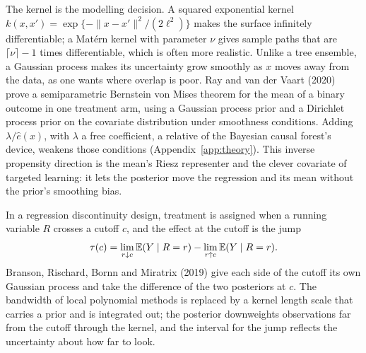 The kernel is the modelling decision. A squared exponential kernel $k(x, x') = \exp\{-\|x - x'\|^2/(2\ell^2)\}$ makes the surface infinitely differentiable; a Mat\'ern kernel with parameter $\nu$ gives sample paths that are $\lceil\nu\rceil - 1$ times differentiable, which is often more realistic. Unlike a tree ensemble, a Gaussian process makes its uncertainty grow smoothly as $x$ moves away from the data, as one wants where overlap is poor. Ray and van der Vaart (2020) prove a semiparametric Bernstein von Mises theorem for the mean of a binary outcome in one treatment arm, using a Gaussian process prior and a Dirichlet process prior on the covariate distribution under smoothness conditions. Adding $\lambda/\hat e(x)$, with $\lambda$ a free coefficient, a relative of the Bayesian causal forest's device, weakens those conditions (Appendix~\ref{app:theory}). This inverse propensity direction is the mean's Riesz representer and the clever covariate of targeted learning: it lets the posterior move the regression and its mean without the prior's smoothing bias.

\begin{example}
In a regression discontinuity design, treatment is assigned when a running variable $R$ crosses a cutoff $c$, and the effect at the cutoff is the jump
\[
\tau(c) = \lim_{r \downarrow c}\mathbb{E}(Y \mid R = r) - \lim_{r \uparrow c}\mathbb{E}(Y \mid R = r).
\]
Branson, Rischard, Bornn and Miratrix (2019) give each side of the cutoff its own Gaussian process and take the difference of the two posteriors at $c$. The bandwidth of local polynomial methods is replaced by a kernel length scale that carries a prior and is integrated out; the posterior downweights observations far from the cutoff through the kernel, and the interval for the jump reflects the uncertainty about how far to look.
\end{example}

